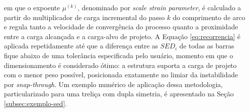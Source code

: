 em que o expoente $\mu^{(k)}$, denominado por
\citealp{hrinda_nguyen2008} \textit{scale strain parameter}, é
calculado a partir do multiplicador de carga incremental do passo
$k$ do comprimento de arco e regula tanto a velocidade de
convergência do processo quanto a proximidade entre a carga
alcançada e a carga-alvo de projeto. A Equação
\ref{eq:recorrencia} é aplicada repetidamente até que a diferença
entre as $SED_i$ de todas as barras fique abaixo de uma tolerância
especificada pelo usuário, momento em que o dimensionamento é
considerado ótimo: a estrutura suporta a carga de projeto com o
menor peso possível, posicionada exatamente no limiar da
instabilidade por \textit{snap-through}. Um exemplo numérico de
aplicação dessa metodologia, particularizado para uma treliça com
dupla simetria, é apresentado na Seção \ref{subsec:exemplo-sed}.